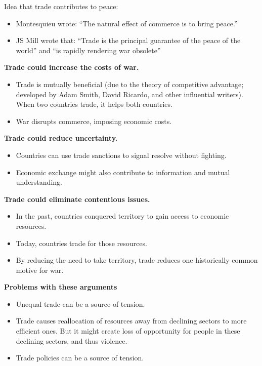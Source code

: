 \documentclass{article}
\begin{document}
Idea that trade contributes to peace:
\begin{itemize}
  \item Montesquieu wrote: ``The natural effect of commerce is to bring peace.''
  \item JS Mill wrote that: ``Trade is the principal guarantee of the peace of the world'' and ``is rapidly rendering war obsolete''
\end{itemize}

{\bf Trade could increase the costs of war.}

\begin{itemize}
  \item Trade is mutually beneficial (due to the theory of competitive advantage; developed by Adam Smith, David Ricardo, and other influential writers).  When two countries trade, it helps both countries.
  \item War disrupts commerce, imposing economic costs.
\end{itemize}

{\bf Trade could reduce uncertainty.}

\begin{itemize}
  \item Countries can use trade sanctions to signal resolve without fighting.
  \item Economic exchange might also contribute to information and mutual understanding.
\end{itemize}

{\bf Trade could eliminate contentious issues.}

\begin{itemize}
  \item In the past, countries conquered territory to gain access to economic resources.
  \item Today, countries trade for those resources.
  \item By reducing the need to take territory, trade reduces one historically common motive for war.
\end{itemize}

{\bf Problems with these arguments}

\begin{itemize}
  \item Unequal trade can be a source of tension.
  \item Trade causes reallocation of resources away from declining sectors to more efficient ones.  But it might create loss of opportunity for people in these declining sectors, and thus violence.
  \item Trade policies can be a source of tension.
\end{itemize}
\end{document}
